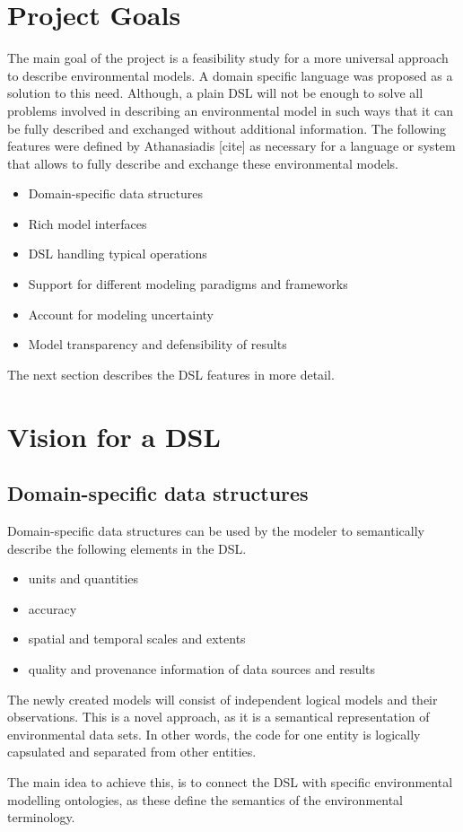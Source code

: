 \section{Project Goals}
\par
The main goal of the project is a feasibility study for a more universal approach to describe environmental models. A domain specific language was proposed as a solution to this need. Although, a plain DSL will not be enough to solve all problems involved in describing an environmental model in such ways that it can be fully described and exchanged without additional information. The following features were defined by Athanasiadis [cite] as necessary for a language or system that allows to fully describe and exchange these environmental models.
\begin{itemize}
	\item Domain-specific data structures
	\item Rich model interfaces    
	\item DSL handling typical operations
	\item Support for different modeling paradigms and frameworks
	\item Account for modeling uncertainty    
	\item Model transparency and defensibility of results 
\end{itemize}
The next section describes the DSL features in more detail.
\section{Vision for a DSL}

\subsection{Domain-specific data structures}
\par
Domain-specific data structures can be used by the modeler to semantically describe the following elements in the DSL.
\begin{itemize}
	\item    units and quantities
	\item    accuracy
	\item    spatial and temporal scales and extents
	\item    quality and provenance information of data sources and results
\end{itemize}
\par
The newly created models will consist of independent logical models and their observations. This is a novel approach, as it is a semantical representation of environmental data sets. In other words, the code for one entity is logically capsulated and separated from other entities.
\par
The main idea to achieve this, is to connect the DSL with specific environmental modelling ontologies, as these define the semantics of the environmental terminology.

